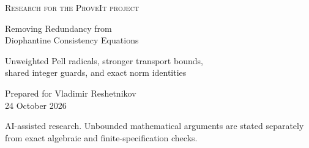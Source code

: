 \documentclass[11pt]{article}
\theoremstyle{remark}
\begin{document}
\hypersetup{pageanchor=false}
\begin{titlepage}
\vspace*{0.3in}
{\small\scshape Research for the ProveIt project\par}
\vspace{0.35in}
{\huge\bfseries\raggedright Removing Redundancy from\\
Diophantine Consistency Equations\par}
\vspace{0.25in}
{\Large Unweighted Pell radicals, stronger transport bounds,\\
shared integer guards, and exact norm identities\par}
\vspace{0.4in}
{\large Prepared for Vladimir Reshetnikov\\24 October 2026\par}
\vspace{0.3in}
\begin{abstract}
We construct and verify several improvements to explicit polynomial equations
whose unsolvability is equivalent to syntactic consistency of ZFC.
A direct quartic over the unrestricted integers is reduced from 604 to
589 unknowns and from 9,676 to 8,156 monomials, at unchanged coefficient
height. A square-gap theorem removes an asymmetric radical weight, and an
auxiliary Pell index bound eliminates a separate transport majorant.
Together they give a ten-positive-variable equation with 96 arithmetic
operations and exact degree 360, and a direct-base companion with
102 operations and exact degree 332.
Exact norm identities give pointwise-identical integer evaluators with
126 operations in thirteen variables, and 138 or 137 in twelve variables.

Complete equations, fixed coefficient payloads, source pins, builders and
exact checkers accompany the report. All comparisons use one frozen
repository snapshot. These results improve specific complexity measures;
they do not establish global minimality or reduce the repository's best
variable count. The arithmetic-to-refutation calibration is inherited.
No new end-to-end Lean, Rocq or object-language ZFC derivation is claimed.
\end{abstract}
\vfill
{\small AI-assisted research. Unbounded mathematical arguments are stated
separately from exact algebraic and finite-specification checks.}
\end{titlepage}
\hypersetup{pageanchor=true}
\begingroup
\small\setlength{\parskip}{0pt}
\tableofcontents
\endgroup
\clearpage
{}
\end{document}
